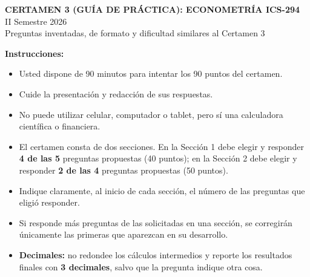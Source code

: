 \documentclass[12pt,letterpaper]{article}
\begin{document}

\begin{center}
{\large \textbf{CERTAMEN 3 (GUÍA DE PRÁCTICA): ECONOMETRÍA ICS-294}}\\
\vspace{0.2cm}
II Semestre 2026\\
Preguntas inventadas, de formato y dificultad similares al Certamen 3
\end{center}

\textbf{Instrucciones:}
\begin{itemize}
    \item Usted dispone de 90 minutos para intentar los 90 puntos del certamen.
    \item Cuide la presentación y redacción de sus respuestas.
    \item No puede utilizar celular, computador o tablet, pero sí una calculadora científica o financiera.
    \item El certamen consta de dos secciones. En la Sección 1 debe elegir y responder \textbf{4 de las 5} preguntas propuestas (40 puntos); en la Sección 2 debe elegir y responder \textbf{2 de las 4} preguntas propuestas (50 puntos).
    \item Indique claramente, al inicio de cada sección, el número de las preguntas que eligió responder.
    \item Si responde más preguntas de las solicitadas en una sección, se corregirán únicamente las primeras que aparezcan en su desarrollo.
    \item \textbf{Decimales:} no redondee los cálculos intermedios y reporte los resultados finales con \textbf{3 decimales}, salvo que la pregunta indique otra cosa.
\end{itemize}

\end{document}
